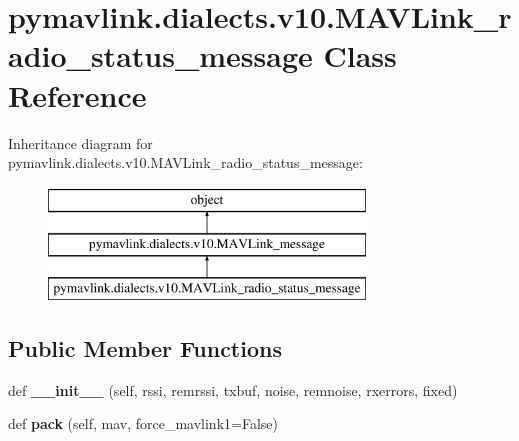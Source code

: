 \hypertarget{classpymavlink_1_1dialects_1_1v10_1_1MAVLink__radio__status__message}{}\section{pymavlink.\+dialects.\+v10.\+M\+A\+V\+Link\+\_\+radio\+\_\+status\+\_\+message Class Reference}
\label{classpymavlink_1_1dialects_1_1v10_1_1MAVLink__radio__status__message}
Inheritance diagram for pymavlink.\+dialects.\+v10.\+M\+A\+V\+Link\+\_\+radio\+\_\+status\+\_\+message\+:\begin{figure}[H]
\begin{center}
\leavevmode
\includegraphics[height=3.000000cm]{classpymavlink_1_1dialects_1_1v10_1_1MAVLink__radio__status__message}
\end{center}
\end{figure}
\subsection*{Public Member Functions}
\begin{DoxyCompactItemize}
\item 
\mbox{\label{classpymavlink_1_1dialects_1_1v10_1_1MAVLink__radio__status__message_aa1883a126f242bd6368b780a7d8ced81}} 
def {\bfseries \+\_\+\+\_\+init\+\_\+\+\_\+} (self, rssi, remrssi, txbuf, noise, remnoise, rxerrors, fixed)
\item 
\mbox{\label{classpymavlink_1_1dialects_1_1v10_1_1MAVLink__radio__status__message_a88beca01ab231f2f5e33b2b12e95a0b0}} 
def {\bfseries pack} (self, mav, force\+\_\+mavlink1=False)
\end{DoxyCompactItemize}

